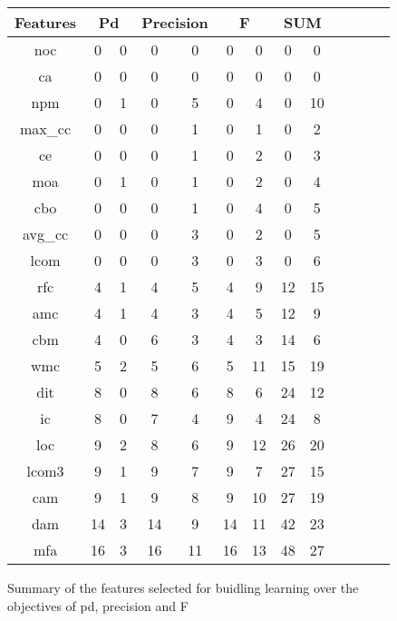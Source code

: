 \documentclass{acm_proc_article-sp}
\begin{document}
\begin{figure*}[!ht]
\scriptsize
\centering
  \begin{tabular}{c|c c|c c|c c|c c|c c|c |c}
  \hline\hline
  Features & \multicolumn{2}{c}{Pd}  & \multicolumn{2}{c}{Precision} & \multicolumn{2}{c}{F}  &\multicolumn{2}{c}{SUM}
\\\hline
  noc& 0& 0& 0& 0& 0& 0&0 & 0\\
ca& 0& 0& 0& 0& 0& 0&0 & 0\\
npm& 0& 1& 0& 5& 0& 4& 0 & 10\\
max\_cc& 0& 0& 0& 1& 0& 1& 0 & 2\\
ce& 0& 0& 0& 1& 0& 2& 0 & 3\\
moa& 0& 1& 0& 1& 0& 2&  0 & 4\\
cbo& 0& 0& 0& 1& 0& 4& 0 & 5\\
avg\_cc& 0& 0& 0& 3& 0& 2& 0 & 5\\
lcom& 0& 0& 0& 3& 0& 3& 0 & 6\\
rfc& 4& 1& 4& 5& 4& 9& 12 & 15\\
amc& 4& 1& 4& 3& 4& 5& 12 & 9\\
cbm& 4& 0& 6& 3& 4& 3&14 & 6\\
wmc& 5& 2& 5& 6& 5& 11&  15 & 19\\
dit& 8& 0& 8& 6& 8& 6& 24 & 12\\
ic& 8& 0& 7& 4& 9& 4& 24 & 8\\
loc& 9& 2& 8& 6& 9& 12& 26 & 20\\
lcom3& 9& 1& 9& 7& 9& 7& 27 & 15\\
cam& 9& 1& 9& 8& 9& 10& 27 & 19\\
dam& 14& 3& 14& 9& 14& 11&  42 & 23\\
mfa& 16& 3& 16& 11& 16& 13&  48 & 27\\

  \end{tabular}
  \caption{Summary of the features selected for buidling learning over the objectives of pd, precision and F}
\end{figure*}


\end{document}
